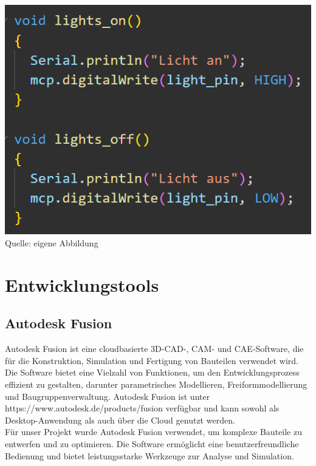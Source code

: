 \documentclass[ngerman,12pt,a4paper]{article}
\begin{document}
		\begin{center}
			\begin{minipage}{0.8\textwidth}
				\centering
				\includegraphics[width=\textwidth]{Pictures/code_licht_schalten}
				\label{fig:code_licht_schalten}
				\vspace{-3pt}
				{\small Quelle: {eigene Abbildung}}
				\vspace{0.5cm}
			\end{minipage}
		\end{center}
		
	\newpage
	\section{Entwicklungstools}
	 \subsection{Autodesk Fusion}

	 Autodesk Fusion ist eine cloudbasierte 3D-CAD-, CAM- und CAE-Software, die für die Konstruktion, Simulation und Fertigung von Bauteilen verwendet wird. Die Software bietet eine Vielzahl von Funktionen, um den Entwicklungsprozess effizient zu gestalten, darunter parametrisches Modellieren, Freiformmodellierung und Baugruppenverwaltung. Autodesk Fusion ist unter https://www.autodesk.de/products/fusion verfügbar und kann sowohl als Desktop-Anwendung als auch über die Cloud genutzt werden. \\[0.5cm]
	 Für unser Projekt wurde Autodesk Fusion verwendet, um komplexe Bauteile zu entwerfen und zu optimieren. Die Software ermöglicht eine benutzerfreundliche Bedienung und bietet leistungsstarke Werkzeuge zur Analyse und Simulation. \\[0.5cm]
	 
\end{document}
